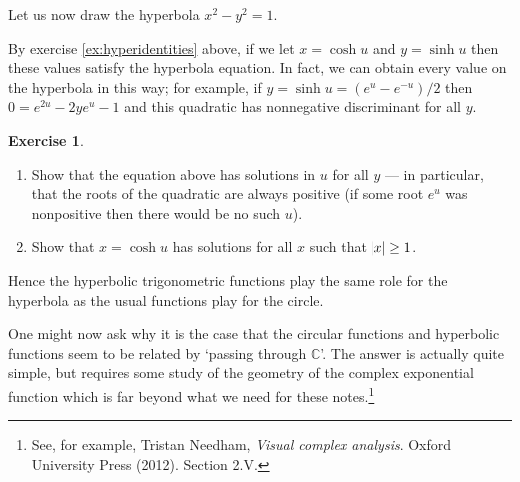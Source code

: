 \documentclass[a4paper,leqno]{article}
\numberwithin{equation}{section}
\theoremstyle{definition}
\newtheorem{exercise}[equation]{Exercise}
\theoremstyle{remark}
\begin{document}
Let us now draw the hyperbola $ x^2 - y^2 = 1 $.
\begin{center}
\end{center}

By exercise \ref{ex:hyperidentities} above, if we let $ x = \cosh u $ and $ y = \sinh u $ then these
values satisfy the hyperbola equation. In fact, we can obtain every value on the hyperbola in this way;
for example, if $ y = \sinh u = (e^u - e^{-u})/2 $ then $ 0 = e^{2u} - 2ye^u - 1 $ and this quadratic
has nonnegative discriminant for all $ y $.

\begin{exercise}\leavevmode
  \begin{enumerate}
    \item Show that the equation above has solutions in $ u $ for all $ y $ --- in particular, that the
          roots of the quadratic are always positive (if some root $ e^u $ was nonpositive then there would
          be no such $ u $).
    \item Show that $ x = \cosh u $ has solutions for all $ x $ such that $ \abs{x} \geq 1 $.
  \end{enumerate}
\end{exercise}

Hence the hyperbolic trigonometric functions play the same role for the hyperbola as the usual functions
play for the circle.

One might now ask why it is the case that the circular functions and hyperbolic functions seem to be
related by `passing through $ \mathbb{C} $'. The answer is actually quite simple, but requires some study
of the geometry of the complex exponential function which is far beyond what we need for these notes.\footnote{See, for example, Tristan Needham, \emph{Visual complex analysis}. Oxford University Press (2012). Section 2.V.  }
\end{document}
